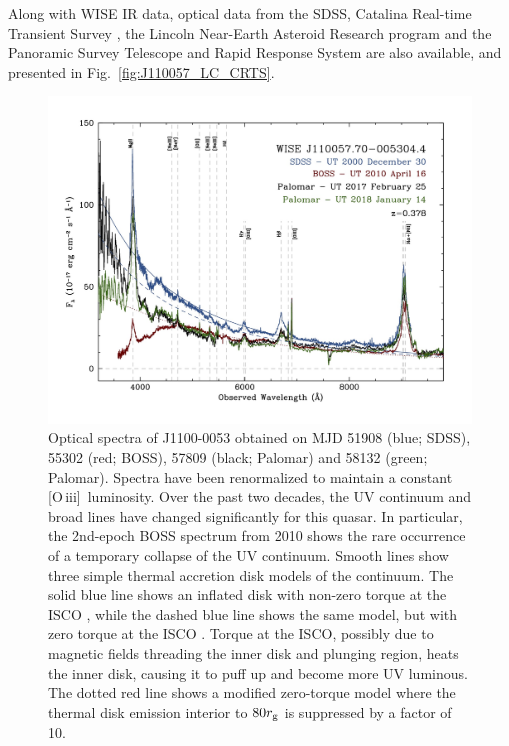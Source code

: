 \documentclass[a4paper,fleqn,usenatbib]{mnras}
\begin{document}
Along with WISE IR data, optical data from the SDSS, Catalina
Real-time Transient Survey \citep[CRTS;][]{Drake2009, Mahabal2011},
the Lincoln Near-Earth Asteroid Research \citep[LINEAR; ][]{Sesar2011}
program and the Panoramic Survey Telescope and Rapid Response System
\citep[PanSTARRS;][]{Kaiser2010, Stubbs2010, Tonry2012, Magnier2013}
are also available, and presented in Fig.~\ref{fig:J110057_LC_CRTS}.




\begin{figure}
  \centering
  \includegraphics[width=17.00cm, trim=0.0cm 0.0cm 0.0cm 0.0cm, clip]
  {../plots/spectra/w1100m0053_sdss_palomar2.jpg}
\vspace{-16pt}
  \caption[]{
    Optical spectra of J1100-0053 obtained on MJD 51908 (blue; SDSS),
    55302 (red; BOSS), 57809 (black; Palomar) and 58132 (green;
    Palomar). Spectra have been renormalized to maintain a constant
    [O\,{\sc iii}]\ luminosity. Over the past two decades, the UV
    continuum and broad lines have changed significantly for this quasar.
    In particular, the 2nd-epoch BOSS spectrum from 2010 shows the rare
    occurrence of a temporary collapse of the UV continuum.  Smooth lines
    show three simple thermal accretion disk models of the continuum.  The
    solid blue line shows an inflated disk with non-zero torque at the
    ISCO \cite[e.g.,][]{Sirko_Goodman2003}, while the dashed blue line
    shows the same model, but with zero torque at the ISCO \cite[i.e.,
    equivalent to a simple $\alpha$-disk model,][]{SS73}.  Torque at the
    ISCO, possibly due to magnetic fields threading the inner disk and
    plunging region, heats the inner disk, causing it to puff up and
    become more UV luminous.  The dotted red line shows a modified
    zero-torque model where the thermal disk emission interior to $80
    r_{\rm g}$ is suppressed by a factor of 10.}
  \label{fig:J110057_spectra}
\end{figure}
\end{document}
